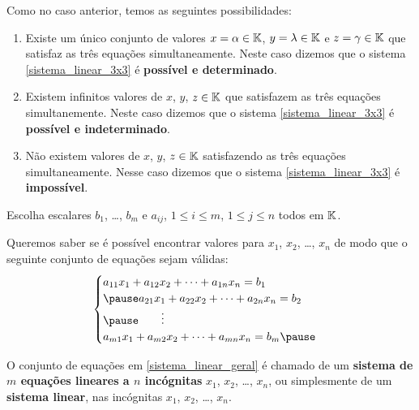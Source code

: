 \documentclass{beamer}
\begin{document}
    \begin{frame}
        Como no caso anterior, temos as seguintes possibilidades:\pause
        \begin{enumerate}[label={\roman*})]
            \item Existe um único conjunto de valores $x = \alpha \in \mathbb{K}$, $y = \lambda \in \mathbb{K}$ e $z = \gamma \in \mathbb{K}$ \pause que satisfaz as três equações simultaneamente. \pause Neste caso dizemos que o sistema \eqref{sistema_linear_3x3} \pause é \textbf{possível e determinado}.\pause

            \item Existem infinitos valores de $x$, $y$, $z \in \mathbb{K}$ \pause que satisfazem as três equações simultanemente. \pause Neste caso dizemos que o sistema \eqref{sistema_linear_3x3} \pause é \textbf{possível e indeterminado}.\pause

            \item Não existem valores de $x$, $y$, $z \in \mathbb{K}$ \pause satisfazendo as três equações simultaneamente. \pause Nesse caso dizemos que o sistema \eqref{sistema_linear_3x3} \pause é \textbf{impossível}.
        \end{enumerate}
    \end{frame}

    \begin{frame}

        Escolha escalares $b_1$, \dots, $b_m$ \pause e $a_{ij}$, \pause $1 \le i \le m$, $1 \le j \le n$ todos em $\mathbb{K}$.

        \vspace{.3cm}

        Queremos saber se é possível encontrar valores para  $x_1$, $x_2$, \dots, $x_n$ \pause de modo que o seguinte conjunto de equações sejam válidas: \pause
        \begin{equation}\label{sistema_linear_geral}
	    \begin{cases}
                a_{11}x_1 + a_{12}x_2 + \cdots + a_{1n}x_n = b_1\\\pause
                a_{21}x_1 + a_{22}x_2 + \cdots + a_{2n}x_n = b_2\\\pause
                \qquad \vdots\\
                a_{m1}x_1 + a_{m2}x_2 + \cdots + a_{mn}x_n = b_m\pause
            \end{cases}
        \end{equation}
        
        O conjunto de equações em \eqref{sistema_linear_geral} é chamado de um \pause \textbf{sistema de $m$ equa\c{c}\~oes lineares \pause a $n$ inc\'ognitas} $x_1$, $x_2$, \dots, $x_n$\pause , ou simplesmente de um \textbf{sistema linear}, nas incógnitas \pause $x_1$, $x_2$, \dots, $x_n$.\pause
    \end{frame}
\end{document}
